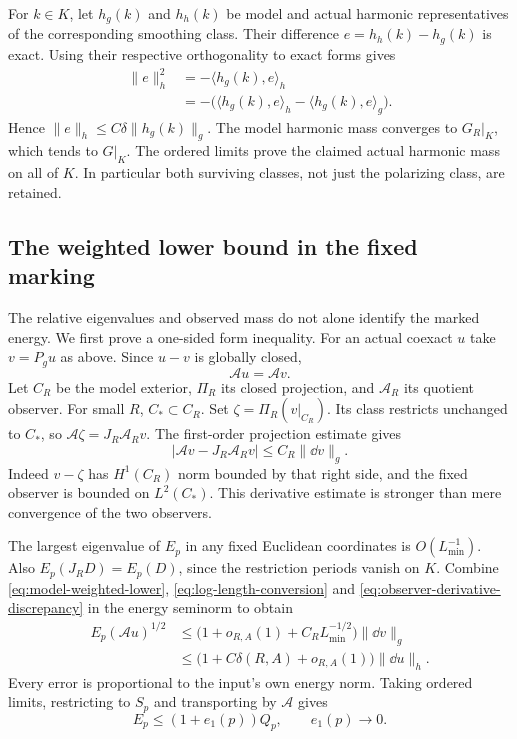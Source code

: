 For $k\in K$, let $h_g(k)$ and $h_h(k)$
be model and actual harmonic representatives
of the corresponding smoothing class.
Their difference $e=h_h(k)-h_g(k)$ is exact.
Using their respective orthogonality to
exact forms gives
\[
 \begin{split}
 \|e\|_h^2
  &=-\langle h_g(k),e\rangle_h\\
  &=-\bigl(\langle h_g(k),e\rangle_h
                          -\langle h_g(k),e\rangle_g\bigr).
 \end{split}
\]
Hence $\|e\|_h\le C\delta\|h_g(k)\|_g$.
The model harmonic mass converges to
$G_R|_K$, which tends to $G|_K$.
The ordered limits prove the claimed
actual harmonic mass on all of $K$.
In particular both surviving classes,
not just the polarizing class, are retained.

\subsection{The weighted lower bound in the fixed marking}

The relative eigenvalues and observed mass
do not alone identify the marked energy.
We first prove a one-sided form inequality.
For an actual coexact $u$ take $v=P_gu$
as above. Since $u-v$ is globally closed,
\begin{equation}\label{eq:observer-projection-invariance}
 \mathcal Au=\mathcal Av.
\end{equation}
Let $C_R$ be the model exterior,
$\Pi_R$ its closed projection, and
$\mathcal A_R$ its quotient observer.
For small $R$, $C_*\subset C_R$.
Set $\zeta=\Pi_R(v|_{C_R})$. Its class
restricts unchanged to $C_*$, so
$\mathcal A\zeta=J_R\mathcal A_Rv$.
The first-order projection estimate gives
\begin{equation}\label{eq:observer-derivative-discrepancy}
 |\mathcal Av-J_R\mathcal A_Rv|
       \le C_R\|\dd v\|_g.
\end{equation}
Indeed $v-\zeta$ has $H^1(C_R)$ norm
bounded by that right side, and the fixed
observer is bounded on $L^2(C_*)$.
This derivative estimate is stronger than
mere convergence of the two observers.

The largest eigenvalue of $E_p$ in any
fixed Euclidean coordinates is
$O(L_{\min}^{-1})$. Also
$E_p(J_RD)=E_p(D)$, since the restriction
periods vanish on $K$. Combine
\eqref{eq:model-weighted-lower},
\eqref{eq:log-length-conversion} and
\eqref{eq:observer-derivative-discrepancy}
in the energy seminorm to obtain
\[
 \begin{split}
 E_p(\mathcal Au)^{1/2}
 &\le\bigl(1+o_{R,A}(1)+C_RL_{\min}^{-1/2}\bigr)
                                      \|\dd v\|_g\\
 &\le\bigl(1+C\delta(R,A)+o_{R,A}(1)\bigr)
                                      \|\dd u\|_h.
 \end{split}
\]
Every error is proportional to the input's
own energy norm. Taking ordered limits,
restricting to $S_p$ and transporting
by $\mathcal A$ gives
\begin{equation}\label{eq:actual-one-sided-energy}
 E_p\le(1+e_1(p))Q_p,\qquad e_1(p)\to0.
\end{equation}

